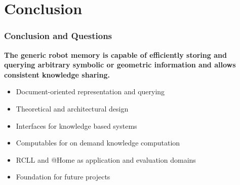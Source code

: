 \section{Conclusion}
\begin{frame}
  \frametitle{Conclusion and Questions}

  \begin{block}{} \centering\bfseries The generic robot memory is capable of
    efficiently storing and querying arbitrary symbolic or geometric information
    and allows consistent knowledge sharing.
  \end{block}

  \bigskip

  \begin{itemize}
  \item Document-oriented representation and querying
  \item Theoretical and architectural design
  \item Interfaces for knowledge based systems
  \item Computables for on demand knowledge computation
  \item RCLL and @Home as application and evaluation domains
  \item Foundation for future projects
  \end{itemize}
\end{frame}


